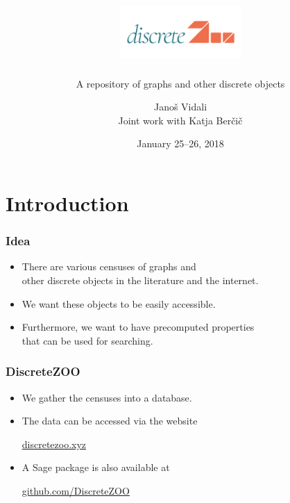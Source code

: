 \documentclass[usepdftitle=false]{beamer}
\title[DiscreteZOO]{\includegraphics[height=2cm]{discretezoo.png}}
\subtitle{A repository of graphs and other discrete objects}
\author{%
  Janoš Vidali \\
  {\scriptsize Joint work with Katja Berčič}
}
\date{January 25--26, 2018}
\newcommand{\keyw}[1]{\textcolor{zooteal}{#1}}
\newcommand{\con}[1]{\textcolor{zoored}{#1}}
\begin{document}
{
\section{Introduction}
\frame[plain]{
\titlepage
}
}

\frame
{
    \frametitle{Idea}

    \begin{itemize}
    \itemsep=5mm
    \item There are various \keyw{censuses} of graphs and \\
    other discrete objects in the literature and the internet.
    \item We want these objects to be \keyw{easily accessible}.
    \item Furthermore, we want to have \keyw{precomputed properties} \\
    that can be used for \keyw{searching}.
    \end{itemize}
}

\frame
{
    \frametitle{DiscreteZOO}

    \begin{itemize}
    \itemsep=5mm
    \item We gather the censuses into a \keyw{database}.
    \item The data can be accessed via the website
    \begin{center}
    \vskip 0.2cm
    \Large \con{\href{http://discretezoo.xyz}{discretezoo.xyz}}
    \end{center}
    \item A \keyw{Sage} package is also available at
    \begin{center}
    \vskip 0.2cm
    \Large \con{\href{https://github.com/DiscreteZOO}{github.com/DiscreteZOO}}
    \end{center}
    \end{itemize}
}
\end{document}
